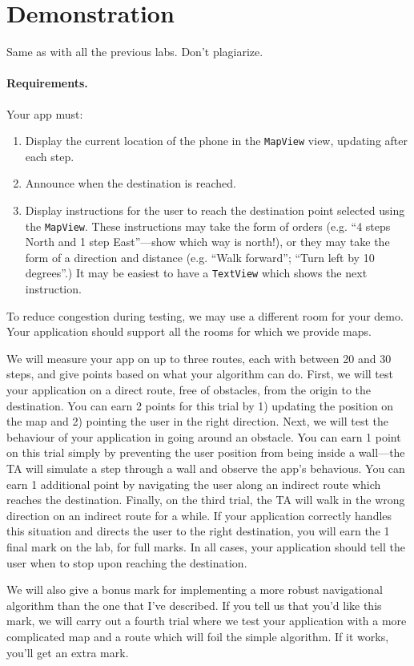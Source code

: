 \documentclass[10pt]{article}
\begin{document}
\section{Demonstration}
Same as with all the previous labs. Don't plagiarize. 
\newpage
\paragraph{Requirements.}
Your app must:
\begin{enumerate}
\item Display the current location of the phone in the {\tt MapView} view, updating after each step.
\item Announce when the destination is reached.
\item Display instructions for the user to reach the destination point selected using the {\tt MapView}. These instructions may take the form of orders (e.g. ``4 steps North and 1 step East''---show which way is north!), or they may take the form of a direction and distance (e.g. ``Walk forward''; ``Turn left by 10 degrees''.) It may be easiest to have a {\tt TextView} which shows the next instruction.
\end{enumerate}
To reduce congestion during testing, we may use a different room for your demo. Your application should support all the rooms for which we provide maps.

We will measure your app on up to three routes, each with between 20 and 30 steps, and give points based on what your algorithm can do. First, we will test your application on a direct route, free of obstacles, from the origin to the destination. You can earn 2 points for this trial by 1) updating the position on the map and 2) pointing the user in the right direction. Next, we will test the behaviour of your application in going around an obstacle. You can earn 1 point on this trial simply by preventing the user position from being inside a wall---the TA will simulate a step through a wall and observe the app's behavious. You can earn 1 additional point by navigating the user along an indirect route which reaches the destination. Finally, on the third trial, the TA will walk in the wrong direction on an indirect route for a while. If your application correctly handles this situation and directs the user to the right destination, you will earn the 1 final mark on the lab, for full marks. In all cases, your application should tell the user when to stop upon reaching the destination.

We will also give a bonus mark for implementing a more robust
navigational algorithm than the one that I've described. If you tell
us that you'd like this mark, we will carry out a fourth trial where
we test your application with a more complicated map and a route which
will foil the simple algorithm.  If it works, you'll get an extra
mark.
\end{document}
